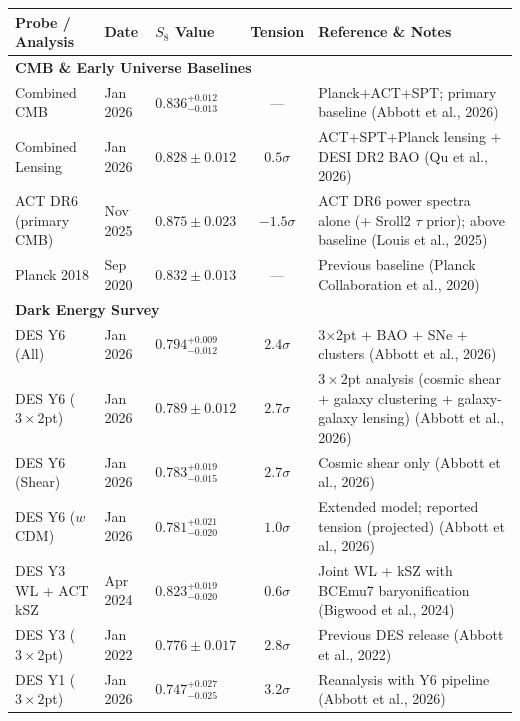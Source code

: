 \documentclass{book}
\begin{document}
	
	\begin{table}[htbp]
		\centering
		\scriptsize %
		\begin{tabularx}{\textwidth}{lll c X} %
			\hline\hline
			\textbf{Probe / Analysis} & \textbf{Date} & \textbf{$S_8$ Value} & \textbf{Tension} & \textbf{Reference \& Notes} \\ \hline
			
			\multicolumn{5}{l}{\textbf{CMB \& Early Universe Baselines}} \\ \hline
			Combined CMB & Jan 2026 & $0.836_{-0.013}^{+0.012}$ & — & Planck+ACT+SPT; primary baseline (Abbott et al., 2026) \\
			Combined Lensing & Jan 2026 & $0.828 \pm 0.012$ & $0.5\sigma$ & ACT+SPT+Planck lensing + DESI DR2 BAO (Qu et al., 2026) \\
			ACT DR6 (primary CMB) & Nov 2025 & $0.875 \pm 0.023$ & $-1.5\sigma$ & ACT DR6 power spectra alone (+ Sroll2 $\tau$ prior); above baseline (Louis et al., 2025) \\
			Planck 2018 & Sep 2020 & $0.832 \pm 0.013$ & — & Previous baseline (Planck Collaboration et al., 2020) \\ \hline
			
			\multicolumn{5}{l}{\textbf{Dark Energy Survey}} \\ \hline
			DES Y6 (All) & Jan 2026 & $0.794_{-0.012}^{+0.009}$ & $2.4\sigma$ & 3$\times$2pt + BAO + SNe + clusters (Abbott et al., 2026) \\
			DES Y6 ($3 \times 2$pt) & Jan 2026 & $0.789 \pm 0.012$ & $2.7\sigma$ & $3 \times 2$pt analysis (cosmic shear + galaxy clustering + galaxy-galaxy lensing) (Abbott et al., 2026) \\
			DES Y6 (Shear) & Jan 2026 & $0.783_{-0.015}^{+0.019}$ & $2.7\sigma$ & Cosmic shear only (Abbott et al., 2026) \\
			DES Y6 ($w$CDM) & Jan 2026 & $0.781_{-0.020}^{+0.021}$ & $1.0\sigma$ & Extended model; reported tension (projected) (Abbott et al., 2026) \\
			DES Y3 WL + ACT kSZ & Apr 2024 & $0.823_{-0.020}^{+0.019}$ & $0.6\sigma$ & Joint WL + kSZ with BCEmu7 baryonification (Bigwood et al., 2024) \\
			DES Y3 ($3 \times 2$pt) & Jan 2022 & $0.776 \pm 0.017$ & $2.8\sigma$ & Previous DES release (Abbott et al., 2022) \\
			DES Y1 ($3 \times 2$pt) & Jan 2026 & $0.747_{-0.025}^{+0.027}$ & $3.2\sigma$ & Reanalysis with Y6 pipeline (Abbott et al., 2026) \\ \hline
			

\end{tabularx}
\end{table}
\end{document}
